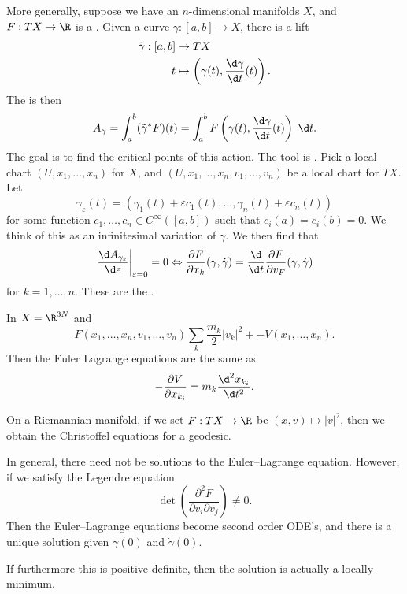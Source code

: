 \documentclass[a4paper]{article}
\begin{document}
More generally, suppose we have an $n$-dimensional manifolds $X$, and $F: TX \to \R$ is a . Given a curve $\gamma: [a, b] \to X$, there is a lift
\begin{align*}
  \tilde{\gamma}: [a, b] &\to TX\\
  t &\mapsto \left(\gamma(t), \frac{\d \gamma}{\d t}(t)\right).
\end{align*}
The  is then
\[
  A_\gamma = \int_a^b (\tilde{\gamma}^* F)(t) = \int_a^b F\left(\gamma(t), \frac{\d \gamma}{\d t}(t)\right) \;\d t.
\]
The goal is to find the critical points of this action. The tool is . Pick a local chart $(U, x_1, \ldots, x_n)$ for $X$, and $(U, x_1, \ldots, x_n, v_1, \ldots, v_n)$ be a local chart for $TX$. Let
\[
  \gamma_\varepsilon(t) = (\gamma_1(t) + \varepsilon c_1(t), \ldots, \gamma_n(t) + \varepsilon c_n(t))
\]
for some function $c_1, \ldots, c_n \in C^\infty([a, b])$ such that $c_i(a) = c_i(b) = 0$. We think of this as an infinitesimal variation of $\gamma$. We then find that
\[
  \left.\frac{\d A_{\gamma_\varepsilon}}{\d \varepsilon} \right|_{\varepsilon = 0} = 0 \Leftrightarrow \frac{\partial F}{\partial x_k}(\gamma, \dot{\gamma}) = \frac{\d}{\d t} \frac{\partial F}{\partial v_F} (\gamma, \dot{\gamma})
\]
for $k = 1, \ldots, n$. These are the .

\begin{eg}
  In $X = \R^{3N}$ and
  \[
    F(x_1, \ldots, x_n, v_1, \ldots, v_n) \sum_k \frac{m_k}{2} |v_k|^2 + - V(x_1, \ldots, x_n).
  \]
  Then the Euler Lagrange equations are the same as
  \[
    -\frac{\partial V}{\partial x_{k_i}} = m_k \frac{\d^2 x_{k_i}}{\d t^2}.
  \]
\end{eg}

\begin{eg}
  On a Riemannian manifold, if we set $F: TX \to \R$ be $(x, v) \mapsto |v|^2$, then we obtain the Christoffel equations for a geodesic.
\end{eg}

In general, there need not be solutions to the Euler--Lagrange equation. However, if we satisfy the Legendre equation
\[
  \det \left(\frac{\partial^2 F}{\partial v_i \partial v_j}\right) \not= 0.
\]
Then the Euler--Lagrange equations become second order ODE's, and there is a unique solution given $\gamma(0)$ and $\dot{\gamma}(0)$.

If furthermore this is positive definite, then the solution is actually a locally minimum.
\end{document}
